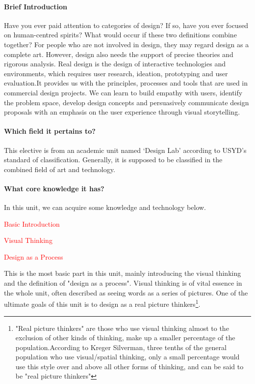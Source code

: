 \documentclass[12pt, a4paper]{article}
\begin{document}
	\paragraph {Brief Introduction}

Have you ever paid attention to categories of design? If so, have you ever focused on human-centred spirits? What would occur if these two definitions combine together? For people who are not involved in design, they may regard design as a complete art. However, design also needs the support of precise theories and rigorous analysis. Real design is the design of interactive technologies and environments, which requires user research, ideation, prototyping and user evaluation.It provides us with the principles, processes and tools that are used in commercial design projects. We can learn to build empathy with users, identify the problem space, develop design concepts and persuasively communicate design proposals with an emphasis on the user experience through visual storytelling.

	\paragraph {Which field it pertains to?}

This elective is from an academic unit named ‘Design Lab' according to USYD’s standard of classification. Generally, it is supposed to be classified in the combined field of art and technology.

	\paragraph {What core knowledge it has?} 

In this unit, we can acquire some knowledge and technology below.
 
\centerline {\textcolor{red}{Basic Introduction}}

\centerline {\textcolor{red}{Visual Thinking}}

\centerline {\textcolor{red}{Design as a Process}}

This is the most basic part in this unit, mainly introducing the visual thinking and the definition of "design as a process". Visual thinking is of vital essence in the whole unit, often described as seeing words as a series of pictures. One of the ultimate goals of this unit is to design as a real picture thinkers\footnote{"Real picture thinkers" are those who use visual thinking almost to the exclusion of other kinds of thinking, make up a smaller percentage of the population.According to Kreger Silverman, three tenths of the general population who use visual/spatial thinking, only a small percentage would use this style over and above all other forms of thinking, and can be said to be "real picture thinkers"}.
 
\end{document}
